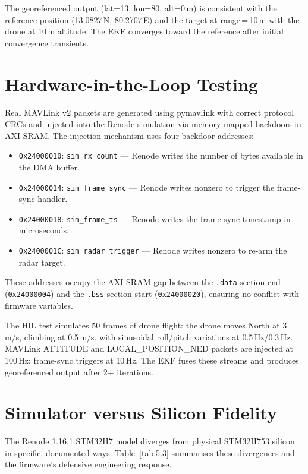 The georeferenced output (lat=13, lon=80, alt=0\,m) is consistent with the reference position (13.0827\,N, 80.2707\,E) and the target at range\,=\,10\,m with the drone at 10\,m altitude. The EKF converges toward the reference after initial convergence transients.

\section{Hardware-in-the-Loop Testing}

Real MAVLink v2 packets are generated using pymavlink with correct protocol CRCs and injected into the Renode simulation via memory-mapped backdoors in AXI SRAM. The injection mechanism uses four backdoor addresses:

\begin{itemize}
\item \texttt{0x24000010}: \texttt{sim\_rx\_count} --- Renode writes the number of bytes available in the DMA buffer.
\item \texttt{0x24000014}: \texttt{sim\_frame\_sync} --- Renode writes nonzero to trigger the frame-sync handler.
\item \texttt{0x24000018}: \texttt{sim\_frame\_ts} --- Renode writes the frame-sync timestamp in microseconds.
\item \texttt{0x2400001C}: \texttt{sim\_radar\_trigger} --- Renode writes nonzero to re-arm the radar target.
\end{itemize}

These addresses occupy the AXI SRAM gap between the \texttt{.data} section end (\texttt{0x24000004}) and the \texttt{.bss} section start (\texttt{0x24000020}), ensuring no conflict with firmware variables.

The HIL test simulates 50 frames of drone flight: the drone moves North at 3\,m/s, climbing at 0.5\,m/s, with sinusoidal roll/pitch variations at 0.5\,Hz/0.3\,Hz. MAVLink ATTITUDE and LOCAL\_POSITION\_NED packets are injected at 100\,Hz; frame-sync triggers at 10\,Hz. The EKF fuses these streams and produces georeferenced output after 2+ iterations.

\section{Simulator versus Silicon Fidelity}

The Renode 1.16.1 STM32H7 model diverges from physical STM32H753 silicon in specific, documented ways. Table~\ref{tab:5.3} summarises these divergences and the firmware's defensive engineering response.

